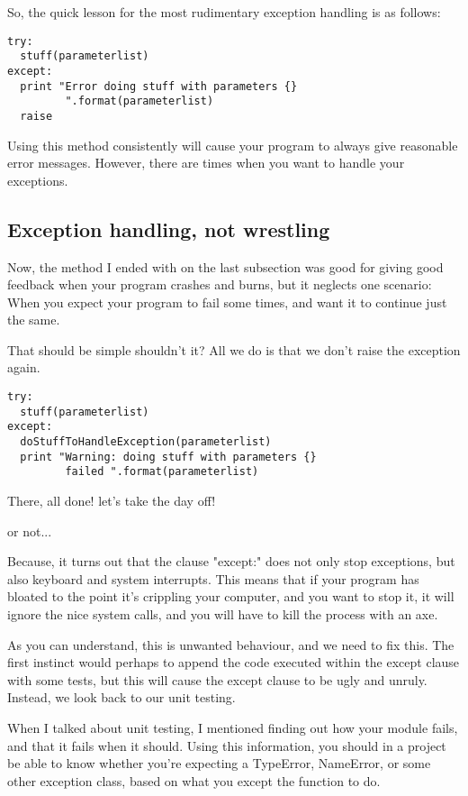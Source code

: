 \documentclass[10pt,a4paper]{article}
\begin{document}
So, the quick lesson for the most rudimentary exception handling is as follows:


\begin{lstlisting}
try: 
  stuff(parameterlist)
except:
  print "Error doing stuff with parameters {} 
         ".format(parameterlist) 
  raise
\end{lstlisting}

Using this method consistently will cause your program to always give reasonable error messages. However, there are times when you want to handle your exceptions.

\subsection{Exception handling, not wrestling}

Now, the method I ended with on the last subsection was good for giving good feedback when your program crashes and burns, but it neglects one scenario: When you expect your program to fail some times, and want it to continue just the same. 

That should be simple shouldn't it? All we do is that we don't raise the exception again.

\begin{lstlisting}
try: 
  stuff(parameterlist)
except:
  doStuffToHandleException(parameterlist)
  print "Warning: doing stuff with parameters {} 
         failed ".format(parameterlist) 
\end{lstlisting}

There, all done! let's take the day off!

or not...

Because, it turns out that the clause "except:" does 
not only stop exceptions, but also keyboard and system interrupts. 
This means that if your program has bloated to the point it's crippling your computer, and you want to stop it, it will ignore the nice system calls, and you will have to kill the process with an axe.

As you can understand, this is unwanted behaviour, and we need to fix this. The first instinct would perhaps to append the code executed within the except clause with some tests, but this will cause the except clause to be ugly and unruly. Instead, we look back to our unit testing. 

When I talked about unit testing, I mentioned finding out how your module fails, and that it fails when it should. Using this information, you should in a project be able to know whether you're expecting a TypeError, NameError, or some other exception class, based on what you except the function to do. 
\end{document}
